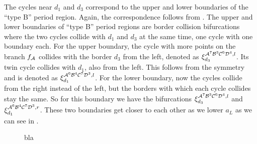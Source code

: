 The cycles near $d_1$ and $d_3$ correspond to the upper and lower boundaries of the ``type B'' period region.
Again, the correspondence follows from .
The upper and lower boundaries of ``type B'' period regions are border collision bifurcations where the two cycles collide with $d_1$ and $d_3$ at the same time, one cycle with one boundary each.
For the upper boundary, the cycle with more points on the branch $f_{\mathcal{A}}$ collides with the border $d_3$ from the left, denoted as $\xi_{d_3}^{\mathcal{A}^7\mathcal{B}^3\mathcal{C}^6\mathcal{D}^4, l}$.
Its twin cycle collides with $d_1$, also from the left.
This follows from the symmetry and is denoted as $\xi_{d_1}^{\mathcal{A}^6\mathcal{B}^4\mathcal{C}^7\mathcal{D}^3, l}$.
For the lower boundary, now the cycles collide from the right instead of the left, but the borders with which each cycle collides stay the same.
So for this boundary we have the bifurcations $\xi_{d_3}^{\mathcal{A}^7\mathcal{B}^3\mathcal{C}^6\mathcal{D}^4, l}$ and $\xi_{d_1}^{\mathcal{A}^6\mathcal{B}^4\mathcal{C}^7\mathcal{D}^3, r}$.
These two boundaries get closer to each other as we lower $a_L$ as we can see in .

\begin{figure}
    \centering
    \label{fig:minrep.just.before.disappearance}
    \caption{bla}
\end{figure}
